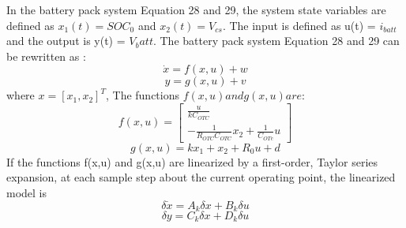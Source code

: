 In the battery pack system Equation 28 and 29, the system state variables are defined as $x_1(t) = SOC_0$ and $x_2(t) = V_{cs}$. The input is defined as u(t) = $i_{batt}$ and the output is y(t) = $V_batt$. The battery pack system Equation 28 and 29 can be rewritten as :
\begin{equation}
    \dot{x}  = f(x,u) + w
\end{equation}
\begin{equation}
    y  = g(x,u) + v
\end{equation}
where $x = [x_1,x_2]^T$, The functions $f(x,u)  and g(x,u) are :$
\begin{equation}\label{eq:Batt_Kalman_State_function}
    f(x,u) =  \begin{bmatrix}
                    \frac{u}{k C_{OTC}} \\
                    -\frac{1}{R_{OTC} C_{OTC}} x_2 + \frac{1}{C_{OTc}} u
               \end{bmatrix}  
\end{equation}
\begin{equation}\label{eq:Batt_Kalaman_output_function}
    g(x,u) = k x_1 + x_2  + R_0 u + d
\end{equation}
If the functions f(x,u) and g(x,u) are linearized by a first-order, Taylor 
series expansion, at each sample step about the current operating point, 
the linearized model is 
\begin{equation}\label{eq:Batt_Kalman_State_function_tylor_expansion}
    \delta \dot{x} = A_k \delta x + B_k \delta u
\end{equation}
\begin{equation}\label{eq:Batt_Kalaman_output_function_tylor_expansion}
    \delta y = C_k \delta x + D_k \delta u
\end{equation}

